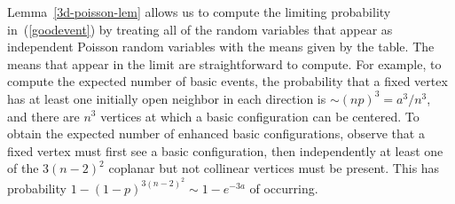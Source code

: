 
\begin{remark}
\label{3d-poisson-rem}
Lemma~\ref{3d-poisson-lem} allows us to compute the limiting probability in~(\ref{goodevent}) by treating all of the random variables that appear as independent Poisson random variables with the means given by the table.  The means that appear in the limit are straightforward to compute.  For example, to compute the expected number of basic events, the probability that a fixed vertex has at least one initially open neighbor in each direction is $\sim (np)^3 = a^3 / n^3$, and there are $n^3$ vertices at which a basic configuration can be centered.  To obtain the expected number of enhanced basic configurations, observe that a fixed vertex must first see a basic configuration, then independently at least one of the $3(n-2)^2$ coplanar but not collinear vertices must be present.  This has probability $1 - (1-p)^{3(n-2)^2} \sim 1 - e^{-3a}$ of occurring. 
\end{remark}

